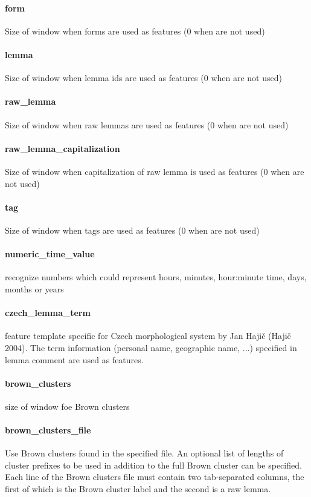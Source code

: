 \documentclass[12pt,a4paper]{report}
\begin{document}
\paragraph{form}
Size of window when forms are used as features (0 when are not used)

\paragraph{lemma}
Size of window when lemma ids are used as features (0 when are not used)

\paragraph{raw\_lemma}
Size of window when raw lemmas are used as features (0 when are not used)

\paragraph{raw\_lemma\_capitalization}
Size of window when capitalization of raw lemma is used as features (0 when are not used)

\paragraph{tag}
Size of window when tags are used as features (0 when are not used)

\paragraph{numeric\_time\_value}
recognize numbers which could represent hours, minutes, hour:minute time, days, months or years

\paragraph{czech\_lemma\_term}
feature template specific for Czech morphological system by Jan Hajič (Hajič 2004). The term information (personal name, geographic name, ...) specified in lemma comment are used as features.

\paragraph{brown\_clusters}size of window foe Brown clusters 

\paragraph{brown\_clusters\_file}
Use Brown clusters found in the specified file. An optional list of lengths of cluster prefixes to be used in addition to the full Brown cluster can be specified. Each line of the Brown clusters file must contain two tab-separated columns, the first of which is the Brown cluster label and the second is a raw lemma.
\end{document}
